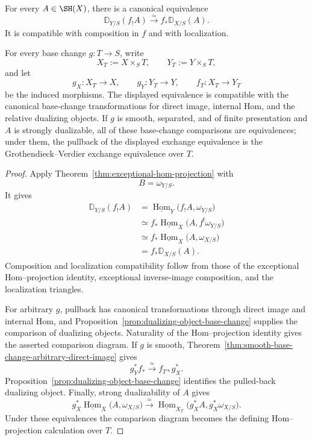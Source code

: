 \begin{theorem}
\label{thm:grothendieck-verdier-exchange}
For every \(A\in\SH(X)\), there is a canonical equivalence
\[
    \mathbb D_{Y/S}(f_!A)
    \xrightarrow{\simeq}
    f_*\mathbb D_{X/S}(A).
\]
It is compatible with composition in \(f\) and with localization.

For every base change \(g:T\to S\), write
\[
    X_T:=X\times_ST,
    \qquad
    Y_T:=Y\times_ST,
\]
and let
\[
    g_X:X_T\to X,
    \qquad
    g_Y:Y_T\to Y,
    \qquad
    f_T:X_T\to Y_T
\]
be the induced morphisms.  The displayed equivalence is compatible with the
canonical base-change transformations for direct image, internal Hom, and
the relative dualizing objects.  If \(g\) is smooth, separated,
and of finite presentation and \(A\) is strongly dualizable, all of these
base-change comparisons are equivalences; under them, the pullback of the
displayed exchange equivalence is the Grothendieck--Verdier exchange
equivalence over \(T\).
\end{theorem}

\begin{proof}
Apply Theorem~\ref{thm:exceptional-hom-projection} with
\[
    B=\omega_{Y/S}.
\]
It gives
\[
\begin{aligned}
    \mathbb D_{Y/S}(f_!A)
    &=
    \underline{\operatorname{Hom}}_Y
    \bigl(
      f_!A,
      \omega_{Y/S}
    \bigr) \\
    &\simeq
    f_*
    \underline{\operatorname{Hom}}_X
    \bigl(
      A,
      f^!\omega_{Y/S}
    \bigr) \\
    &\simeq
    f_*
    \underline{\operatorname{Hom}}_X
    \bigl(
      A,
      \omega_{X/S}
    \bigr) \\
    &=
    f_*\mathbb D_{X/S}(A).
\end{aligned}
\]
Composition and localization compatibility follow from those of the
exceptional Hom--projection identity, exceptional inverse-image
composition, and the localization triangles.

For arbitrary \(g\), pullback has canonical transformations through direct
image and internal Hom, and
Proposition~\ref{prop:dualizing-object-base-change} supplies the comparison
of dualizing objects.  Naturality of the Hom--projection identity gives the
asserted comparison diagram.  If \(g\) is smooth,
Theorem~\ref{thm:smooth-base-change-arbitrary-direct-image} gives
\[
    g_Y^*f_*
    \xrightarrow{\simeq}
    f_{T*}g_X^*.
\]
Proposition~\ref{prop:dualizing-object-base-change} identifies the pulled-back
dualizing object.  Finally, strong dualizability of \(A\) gives
\[
    g_X^*
    \underline{\operatorname{Hom}}_X
    \bigl(
      A,
      \omega_{X/S}
    \bigr)
    \xrightarrow{\simeq}
    \underline{\operatorname{Hom}}_{X_T}
    \bigl(
      g_X^*A,
      g_X^*\omega_{X/S}
    \bigr).
\]
Under these equivalences the comparison diagram becomes the defining
Hom--projection calculation over \(T\).
\end{proof}

